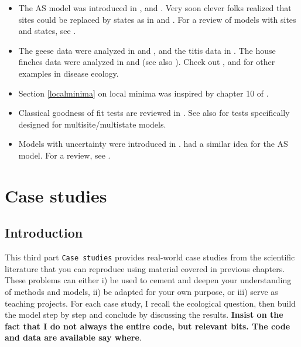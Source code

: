 \documentclass[
  12pt,
]{krantz}
\begin{document}
\begin{itemize}
\item
  The AS model was introduced in \citet{arnason1972}, \citet{arnason1973} and \citet{SchwarzEtAl1993}. Very soon clever folks realized that sites could be replaced by states as in \citet{NicholsEtAl1992} and \citet{NicholsEtAl1994}. For a review of models with sites and states, see \citet{LebretonEtAl2009}.
\item
  The geese data were analyzed in \citet{hestbeck1991estimates} and \citet{BrownieEtAl1993}, and the titis data in \citet{scofield2001titi}. The house finches data were analyzed in \citet{FaustinoEtAl2004} and \citet{ConnCooch2009} (see also \citet{cooch2012disease}). Check out \citet{santoro2014host}, \citet{MarescotEtAl2018} and \citet{ollivier2023lyme} for other examples in disease ecology.
\item
  Section \ref{localminima} on local minima was inspired by chapter 10 of \citet{cooch2017intromark}.
\item
  Classical goodness of fit tests are reviewed in \citet{pradel2005gof}. See also \citet{pradel2003gof} for tests specifically designed for multisite/multistate models.
\item
  Models with uncertainty were introduced in \citet{pradel_multievent_2005}. \citet{dupuis_bayesian_1995} had a similar idea for the AS model. For a review, see \citet{gimenez_estimating_2012}.
\end{itemize}

\part{Case studies}\label{part-case-studies}

\chapter*{Introduction}\label{introduction-7}


This third part \texttt{Case\ studies} provides real-world case studies from the scientific literature that you can reproduce using material covered in previous chapters. These problems can either i) be used to cement and deepen your understanding of methods and models, ii) be adapted for your own purpose, or iii) serve as teaching projects. For each case study, I recall the ecological question, then build the model step by step and conclude by discussing the results. \textbf{Insist on the fact that I do not always the entire code, but relevant bits. The code and data are available say where}.
\end{document}
